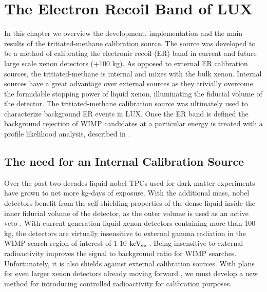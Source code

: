 \renewcommand{\thechapter}{7}

\chapter{The Electron Recoil Band of LUX}
\label{Ch:T}

In this chapter we overview the development, implementation and the main results of the tritiated-methane calibration source. The source was developed to be a method of calibrating the electronic recoil (ER) band in current and future large scale xenon detectors (+100 kg). As opposed to external ER calibration sources, the tritiated-methane is internal and mixes with the bulk xenon. Internal sources have a great advantage over external sources as they trivially overcome the formidable stopping power of liquid xenon, illuminating the fiducial volume of the detector. The tritiated-methane calibration source was ultimately used to characterize background ER events in LUX. Once the ER band is defined the background rejection of WIMP candidates at a particular energy is treated with a profile likelihood analysis, described in \cite{LUX_PRL}.

\section{The need for an Internal Calibration Source} %

Over the past two decades liquid nobel TPCs used for dark-matter experiments have grown to net more kg-days of exposure. With the additional mass, nobel detectors benefit from the self shielding properties of the dense liquid inside the inner fiducial volume of the detector, as the outer volume is used as an active veto \cite{Aprile_LXe_overview}. With current generation liquid xenon detectors containing more than 100 kg, the detectors are virtually insensitive to external gamma radiation in the WIMP search region of interest of 1-10 $\rm keV_{ee}$ \cite{LUX_BG} \cite{Xenon100} \cite{PandaX} \cite{XMass}. Being insensitive to external radioactivity improves the signal to background ratio for WIMP searches. Unfortunately, it is also shields against external calibration sources. With plans for even larger xenon detectors already moving forward \cite{LZ} \cite{Xenon1T}, we must develop a new method for introducing controlled radioactivity for calibration purposes.

